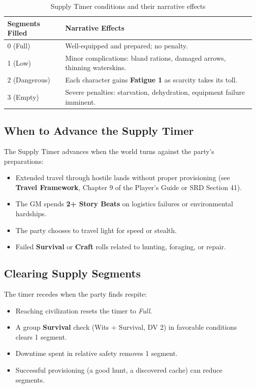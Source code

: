 \begin{table}[htbp]
\centering
\small
\begin{tabularx}{\linewidth}{lX}
\toprule
\textbf{Segments Filled} & \textbf{Narrative Effects} \\
\midrule
0 (Full) & Well-equipped and prepared; no penalty. \\
1 (Low) & Minor complications: bland rations, damaged arrows, thinning waterskins. \\
2 (Dangerous) & Each character gains \textbf{Fatigue 1} as scarcity takes its toll. \\
3 (Empty) & Severe penalties: starvation, dehydration, equipment failure imminent. \\
\bottomrule
\end{tabularx}
\caption{Supply Timer conditions and their narrative effects}
\label{tab:supply-timer-states}
\end{table}

\subsection{When to Advance the Supply Timer }
\label{subsec:supply-advance}

The Supply Timer advances when the world turns against the party's preparations:
\begin{itemize}
  \item Extended travel through hostile lands without proper provisioning (see \textbf{Travel Framework}, Chapter 9 of the Player's Guide or SRD Section 41).
  \item The GM spends \textbf{2+ Story Beats} on logistics failures or environmental hardships.
  \item The party chooses to travel light for speed or stealth.
  \item Failed \textbf{Survival} or \textbf{Craft} rolls related to hunting, foraging, or repair.
\end{itemize}

\subsection{Clearing Supply Segments}
\label{subsec:supply-clear}

The timer recedes when the party finds respite:
\begin{itemize}
  \item Reaching civilization resets the timer to \textit{Full}.
  \item A group \textbf{Survival} check (Wits + Survival, DV 2) in favorable conditions clears 1 segment.
  \item Downtime spent in relative safety removes 1 segment.
  \item Successful provisioning (a good hunt, a discovered cache) can reduce segments.
\end{itemize}

